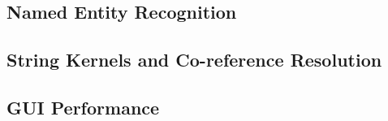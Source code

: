 \subsection {Named Entity Recognition}
\label{sec:eval:named_entity_recognition}


\subsection {String Kernels and Co-reference Resolution}
\label{sec:eval:string_kernels_and_co-reference_resolution}


\subsection {GUI Performance}
\label{sec:eval:gui_performance}

